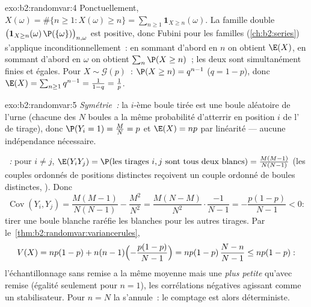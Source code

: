 \begin{solution}{exo:b2:randomvar:4}
Ponctuellement, $X(\omega) = \#\{n \geq 1 : X(\omega) \geq n\} =
\sum_{n\geq1}\mathbf{1}_{X \geq n}(\omega)$. La famille double
$\bigl(\mathbf{1}_{X \geq n}(\omega)\,\P(\{\omega\})\bigr)_{n,
\omega}$ est positive, donc Fubini pour les familles
(\cref{ch:b2:series}) s'applique inconditionnellement~: en sommant d'abord en
$n$ on obtient $\E(X)$, en sommant d'abord en $\omega$ on obtient $\sum_n \P(X
\geq n)$~; les deux sont simultanément finies et égales. Pour $X \sim
\mathcal{G}(p)$~: $\P(X \geq n) = q^{n-1}$ ($q = 1-p$), donc $\E(X) =
\sum_{n\geq1}q^{n-1} = \frac{1}{1 - q} = \frac1p$.
\end{solution}

\begin{solution}{exo:b2:randomvar:5}
\emph{Symétrie~:} la $i$-ème boule tirée est une boule 
aléatoire de l'urne (chacune des $N$ boules a la même probabilité d'atterrir en
position $i$ de l' de tirage), donc $\P(Y_i = 1) = \frac MN =
p$ et $\E(X) = np$ par linéarité --- aucune indépendance nécessaire.

\emph{~:} pour $i \neq j$, $\E(Y_iY_j) = \P(\text{les tirages }
i, j \text{ sont tous deux blancs}) = \frac{M(M-1)}{N(N-1)}$ (les couples
ordonnés de positions distinctes reçoivent un couple ordonné de boules distinctes,
). Donc
\[
\operatorname{Cov}(Y_i, Y_j)
= \frac{M(M-1)}{N(N-1)} - \frac{M^2}{N^2}
= \frac{M(N - M)}{N^2}\cdot\frac{-1}{N-1}
= -\frac{p(1-p)}{N-1} < 0 :
\]
tirer une boule blanche raréfie les blanches pour les autres tirages.
Par le~\cref{thm:b2:randomvar:variancerules},
\[
V(X) = np(1-p) + n(n-1)\Bigl(-\frac{p(1-p)}{N-1}\Bigr)
= np(1-p)\,\frac{N - n}{N - 1} \leq np(1-p) :
\]
l'échantillonnage sans remise a la même moyenne mais une  \emph{plus petite}
qu'avec remise (égalité seulement pour $n = 1$), les corrélations
négatives agissant comme un stabilisateur. Pour $n = N$ la
 s'annule~: le comptage est alors déterministe.
\end{solution}

